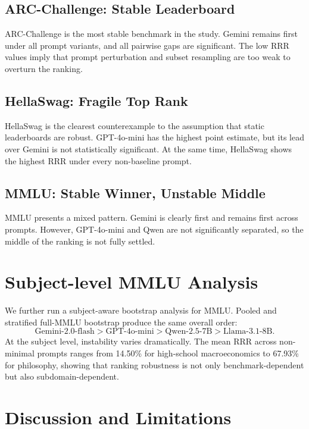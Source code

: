 \documentclass[11pt]{article}
\begin{document}
\subsection{ARC-Challenge: Stable Leaderboard}

ARC-Challenge is the most stable benchmark in the study. Gemini remains first under all prompt variants, and all pairwise gaps are significant. The low RRR values imply that prompt perturbation and subset resampling are too weak to overturn the ranking.

\subsection{HellaSwag: Fragile Top Rank}

HellaSwag is the clearest counterexample to the assumption that static leaderboards are robust. GPT-4o-mini has the highest point estimate, but its lead over Gemini is not statistically significant. At the same time, HellaSwag shows the highest RRR under every non-baseline prompt.

\subsection{MMLU: Stable Winner, Unstable Middle}

MMLU presents a mixed pattern. Gemini is clearly first and remains first across prompts. However, GPT-4o-mini and Qwen are not significantly separated, so the middle of the ranking is not fully settled.

\section{Subject-level MMLU Analysis}

We further run a subject-aware bootstrap analysis for MMLU. Pooled and stratified full-MMLU bootstrap produce the same overall order:
\[
\text{Gemini-2.0-flash} > \text{GPT-4o-mini} > \text{Qwen-2.5-7B} > \text{Llama-3.1-8B}.
\]
At the subject level, instability varies dramatically. The mean RRR across non-minimal prompts ranges from 14.50\% for high-school macroeconomics to 67.93\% for philosophy, showing that ranking robustness is not only benchmark-dependent but also subdomain-dependent.

\section{Discussion and Limitations}
\end{document}
